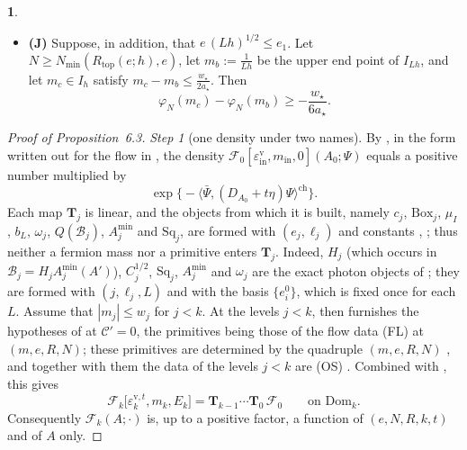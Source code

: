 \documentclass[11pt]{amsart}
\newcommand{\namedhead}{}
\theoremstyle{definition}
\newtheorem*{namedinner}{\namedhead}
\newenvironment{named}[1]{\renewcommand{\namedhead}{#1}\begin{namedinner}}{\end{namedinner}}
\begin{document}
\begin{named}{Proposition 6.3}
\begin{itemize}
\begin{equation*}
\end{equation*}
In particular $\varphi_N(m'')>\varphi_N(m')$ whenever $m''-m'\ge2e_\star^\varepsilon w_\star/a_\star$.
\item[(d)] \textbf{(J)}
Suppose, in addition, that $e\,(Lh)^{1/2}\le e_1$.
Let $N\ge N_{\min}(R_{\mathrm{top}}(e;h),e)$, let $m_b:=\frac1{Lh}$ be the upper end point of $I_{Lh}$, and let $m_c\in I_h$ satisfy $m_c-m_b\le\frac{w_\star}{2a_\star}$.
Then
\begin{equation*}
\varphi_N(m_c)-\varphi_N(m_b)\ge-\frac{w_\star}{6a_\star}.
\end{equation*}
\end{itemize}
\end{named}

\begin{proof}[Proof of Proposition~6.3]
\emph{Step 1} (one density under two names).
By \cite[Section~I.5.10, (I.L0.22), (I.L0.7), (I.L0.2)]{QEDIII}, in the form written out for the flow in \cite[Chapter~29, P1, (Q4)]{QEDIII}, the density $\mathscr F_0[\varepsilon^{\mathrm v}_{\mathrm{in}},\allowbreak m_{\mathrm{in}},\allowbreak 0](A_0;\Psi)$ equals a positive number multiplied by
\begin{equation*}
\exp\bigl\{-\langle\bar\Psi,(D_{A_0}+t\eta)\Psi\rangle^{\mathrm{ch}}\bigr\}.
\end{equation*}
Each map $\mathbf T_j$ is linear, and the objects from which it is built, namely $c_j$, $\mathrm{Box}_j$, $\mu_I$, $b_L$, $\omega_j$, $Q(\mathscr B_j)$, $A^{\min}_j$ and $\mathrm{Sq}_j$, are formed with $(e_j,\ell_j)$ and constants \cite[Sections~I.3.2--I.3.4, I.5.7]{QEDIII}, \cite[Section~5.2.5]{QEDI};
thus neither a fermion mass nor a primitive enters $\mathbf T_j$.
Indeed, $H_j$ (which occurs in $\mathscr B_j=H_jA^{\min}_j(A')$), $C_j^{1/2}$, $\mathrm{Sq}_j$, $A^{\min}_j$ and $\omega_j$ are the exact photon objects of \cite[Section~5.2.5]{QEDI};
they are formed with $(j,\ell_j,L)$ and with the basis $\{e_i^0\}$, which is fixed once for each $L$.
Assume that $|m_j|\le w_j$ for $j<k$.
At the levels $j<k$, \cite[Proposition~28.1]{QEDIII} then furnishes the hypotheses of \cite[Proposition~24.1\,(c)]{QEDIII} at $\mathscr C'=0$, the primitives being those of the flow data (FL) at $(m,e,R,N)$;
these primitives are determined by the quadruple $(m,e,R,N)$ \cite[Sections~I.1.8, G4.0.1; Proposition~26.6\,(e)]{QEDIII}, and together with them the data of the levels $j<k$ are (OS) \cite[Proposition~26.6\,(b)]{QEDIII}.
Combined with \cite[Proposition~5.38\,(i), (ii)]{QEDI}, this gives
\begin{equation*}
\mathscr F_k\bigl[\varepsilon^{\mathrm v,t}_k,m_k,E_k\bigr]=\mathbf T_{k-1}\cdots\mathbf T_0\,\mathscr F_0\qquad\text{on }\mathrm{Dom}_k .
\end{equation*}
Consequently $\mathscr F_k(A;\cdot)$ is, up to a positive factor, a function of $(e,N,R,k,t)$ and of $A$ only.


\end{proof}
\end{document}
